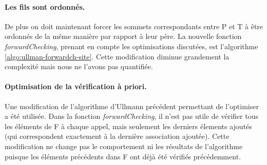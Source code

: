 
\paragraph{Les fils sont ordonnés.}
De plus on doit maintenant forcer les sommets correspondants entre P et T à être ordonnés de la même manière par rapport à leur père. 
La nouvelle fonction \emph{forwardChecking}, prenant en compte les optimisations discutées, est l'algorithme \ref{algo:ullman-forwardch-site}.
Cette modification diminue grandement la complexité mais nous ne l'avons pas quantifiée.

\paragraph{Optimisation de la vérification à priori.}
Une modification de l'algorithme d'Ullmann précédent permettant de l'optimiser a été utilisée. Dans la fonction \emph{forwardChecking}, il n'est pas utile de vérifier tous les éléments de F à chaque appel, mais seulement les derniers élements ajoutés (qui correspondent exactement à la dernière association ajoutée). Cette modification ne change pas le comportement ni les résultats de l'algorithme puisque les éléments précédents dans F ont déjà été vérifiés précédemment.

